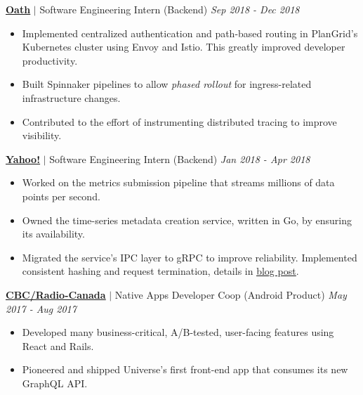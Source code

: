 \documentclass[paper=a4,fontsize=15pt]{scrartcl}
\newcommand{\smolboispace}{\vspace*{0.1em}}
\newcommand{\bighalfspace}{\vspace*{0.75em}}
\begin{document}
\smolboispace
\smolboispace
\bighalfspace
\normalsize
\noindent \href{https://mail.yahoo.com}{\textbf{\ul{Oath}}}
$\vert$ \small Software Engineering Intern (Backend)
{\hfill \footnotesize \textit{Sep 2018 - Dec 2018}}
\begin{itemize}[noitemsep,leftmargin=20pt,label=\raisebox{0.25ex}{\tiny$\bullet$},topsep=5pt]
  \small
  \item Implemented centralized authentication and path-based routing in
    PlanGrid's Kubernetes cluster using Envoy and Istio. This greatly improved
    developer productivity.
  \item Built Spinnaker pipelines to allow \textit{phased rollout} for
    ingress-related infrastructure changes.
  \item Contributed to the effort of instrumenting distributed tracing to
    improve visibility.
\end{itemize}

\smolboispace
\smolboispace
\bighalfspace
\normalsize
\noindent \href{https://mail.yahoo.com}{\textbf{\ul{Yahoo!}}}
$\vert$ \small Software Engineering Intern (Backend)
{\hfill \footnotesize \textit{Jan 2018 - Apr 2018}}
\begin{itemize}[noitemsep,leftmargin=20pt,label=\raisebox{0.25ex}{\tiny$\bullet$},topsep=5pt]
  \small
  \item Worked on the metrics submission pipeline that streams millions of data
    points per second.
  \item Owned the time-series metadata creation service, written in Go, by
    ensuring its availability.
  \item Migrated the service's IPC layer to gRPC to improve reliability.
    Implemented consistent hashing and request termination, details in
    \href{http://lpan.io/migrating-to-grpc}{\ul{blog post}}.
\end{itemize}

\smolboispace
\smolboispace
\bighalfspace
\normalsize
\noindent \href{https://cbc.ca}{\ul{\textbf{CBC/Radio-Canada}}}
$\vert$ \small Native Apps Developer Coop (Android Product)
{\hfill \footnotesize \textit{May 2017 - Aug 2017}}
\begin{itemize}[noitemsep,leftmargin=20pt,label=\raisebox{0.25ex}{\tiny$\bullet$},topsep=5pt]
  \small
  \item Developed many business-critical, A/B-tested, user-facing features
    using React and Rails.
  \item Pioneered and shipped Universe's first front-end app that consumes its
    new GraphQL API.
\end{itemize}
\end{document}
